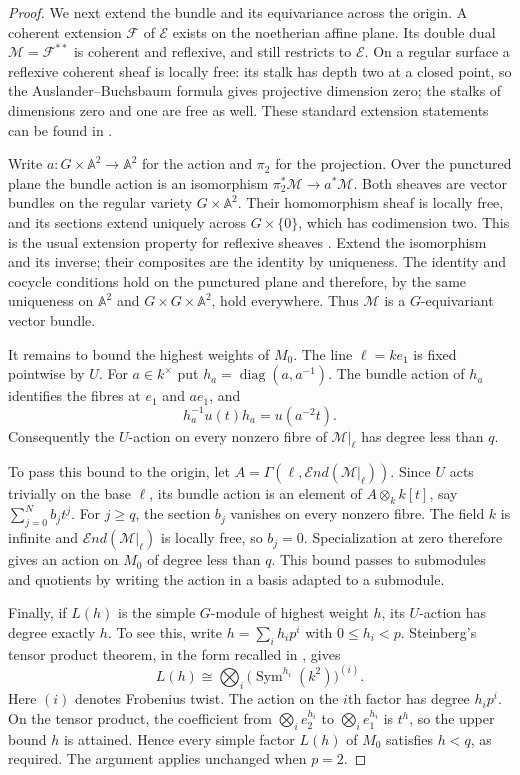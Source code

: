\begin{proof}
We next extend the bundle and its equivariance across the origin.
A coherent extension $\mathcal F$ of $\mathcal E$ exists on the
noetherian affine plane. Its double dual
$\mathcal M=\mathcal F^{**}$ is coherent and reflexive, and still
restricts to $\mathcal E$. On a regular surface a reflexive coherent
sheaf is locally free: its stalk has depth two at a closed point,
so the Auslander--Buchsbaum formula gives projective dimension zero;
the stalks of dimensions zero and one are free as well.
These standard extension statements can be found in
\cite[Tags 0G41, 0AY4, and 0B3N]{StacksProject}.

Write $a:G\times\mathbb A^2\to\mathbb A^2$ for the action and
$\pi_2$ for the projection. Over the punctured plane the bundle
action is an isomorphism $\pi_2^*\mathcal M\to a^*\mathcal M$.
Both sheaves are vector bundles on the regular variety
$G\times\mathbb A^2$. Their homomorphism sheaf is locally free,
and its sections extend uniquely across $G\times\{0\}$, which
has codimension two. This is the usual extension property for
reflexive sheaves \cite[Tag 0EBJ]{StacksProject}. Extend the isomorphism
and its inverse; their composites are the identity by uniqueness.
The identity and cocycle conditions hold on the punctured plane
and therefore, by the same uniqueness on $\mathbb A^2$ and
$G\times G\times\mathbb A^2$, hold everywhere. Thus
$\mathcal M$ is a $G$-equivariant vector bundle.

It remains to bound the highest weights of $M_0$. The line
$\ell=ke_1$ is fixed pointwise by $U$. For $a\in k^\times$ put
$h_a=\operatorname{diag}(a,a^{-1})$. The bundle action of $h_a$
identifies the fibres at $e_1$ and $ae_1$, and
\[
 h_a^{-1}u(t)h_a=u(a^{-2}t).
\]
Consequently the $U$-action on every nonzero fibre of
$\mathcal M|_\ell$ has degree less than $q$.

To pass this bound to the origin, let
$A=\Gamma(\ell,\mathcal End(\mathcal M|_\ell))$.
Since $U$ acts trivially on the base $\ell$, its bundle action is
an element of $A\otimes_k k[t]$, say
$\sum_{j=0}^{N} b_jt^j$. For $j\geq q$, the section $b_j$
vanishes on every nonzero fibre. The field $k$ is infinite and
$\mathcal End(\mathcal M|_\ell)$ is locally free, so $b_j=0$.
Specialization at zero therefore gives an action on $M_0$ of
degree less than $q$. This bound passes to submodules and
quotients by writing the action in a basis adapted to a submodule.

Finally, if $L(h)$ is the simple $G$-module of highest weight $h$,
its $U$-action has degree exactly $h$. To see this, write
$h=\sum_i h_ip^i$ with $0\leq h_i<p$. Steinberg's tensor product
theorem, in the form recalled in \cite[Lemma 1.1 and the proof of
Theorem 2.1]{DotyHenke2005}, gives
\[
 L(h)\cong\bigotimes_i
 \bigl(\operatorname{Sym}^{h_i}(k^2)\bigr)^{(i)}.
\]
Here $(i)$ denotes Frobenius twist. The action on the $i$th factor
has degree $h_ip^i$. On the tensor product, the coefficient from
$\bigotimes_i e_2^{h_i}$ to $\bigotimes_i e_1^{h_i}$ is $t^h$,
so the upper bound $h$ is attained. Hence every simple factor
$L(h)$ of $M_0$ satisfies $h<q$, as required. The argument applies
unchanged when $p=2$.
\end{proof}


